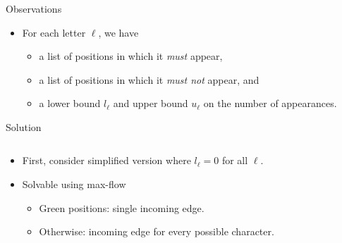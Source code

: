\begin{frame}
    \frametitle{\problemtitle}

    \begin{block}{Observations}
        \begin{itemize}
            \item<1-> For each letter $\ell$, we have
            \begin{itemize}
                \item a list of positions in which it \emph{must} appear,
                \item a list of positions in which it \emph{must not} appear, and
                \item a lower bound $l_\ell$ and upper bound $u_\ell$ on the number of appearances.
            \end{itemize}
        \end{itemize}
    \end{block}

    \begin{block}{Solution}
        \vspace{1em}
        \begin{columns}
            \begin{column}[T]{0.6\textwidth}
                \begin{itemize}
                    \item<2-> First, consider simplified version where $l_\ell = 0$ for all $\ell$.
                    \item<3-> Solvable using max-flow
                    \begin{itemize}
                        \item Green positions: single incoming edge.
                        \item Otherwise: incoming edge for every possible character.
                    \end{itemize}
                \end{itemize}
            \end{column}

            \hfill


\end{columns}
\end{block}
\end{frame}
